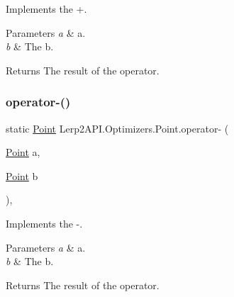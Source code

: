 Implements the +. 


\begin{DoxyParams}{Parameters}
{\em a} & a.\\
\hline
{\em b} & The b.\\
\hline
\end{DoxyParams}
\begin{DoxyReturn}{Returns}
The result of the operator.
\end{DoxyReturn}
\mbox{\label{struct_lerp2_a_p_i_1_1_optimizers_1_1_point_a166b0ec397e9dba06f03a3ebb4c3217f}} 
\subsubsection{\texorpdfstring{operator-\/()}{operator-()}}
{\footnotesize\ttfamily static \hyperlink{struct_lerp2_a_p_i_1_1_optimizers_1_1_point}{Point} Lerp2\+A\+P\+I.\+Optimizers.\+Point.\+operator-\/ (\begin{DoxyParamCaption}\item[{\hyperlink{struct_lerp2_a_p_i_1_1_optimizers_1_1_point}{Point}}]{a,  }\item[{\hyperlink{struct_lerp2_a_p_i_1_1_optimizers_1_1_point}{Point}}]{b }\end{DoxyParamCaption})\hspace{0.3cm}{\ttfamily [inline]}, {\ttfamily [static]}}



Implements the -\/. 


\begin{DoxyParams}{Parameters}
{\em a} & a.\\
\hline
{\em b} & The b.\\
\hline
\end{DoxyParams}
\begin{DoxyReturn}{Returns}
The result of the operator.
\end{DoxyReturn}
\mbox{\label{struct_lerp2_a_p_i_1_1_optimizers_1_1_point_abecde15fa8399e61cea353ac050a0968}} 
